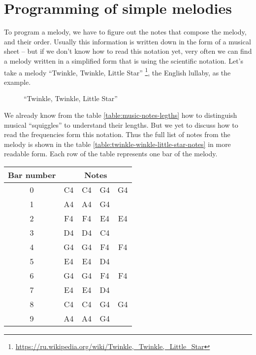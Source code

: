 \documentclass[../sparc.tex]{subfiles}
\begin{document}
\section{Programming of simple melodies}

To program a melody, we have to figure out the notes that compose the melody,
and their order.  Usually this information is written down in the form of a
musical sheet -- but if we don't know how to read this notation yet, very often
we can find a melody written in a simplified form that is using the scientific
notation.  Let's take a melody ``Twinkle, Twinkle, Little
Star'' \footnote{\url{https://ru.wikipedia.org/wiki/Twinkle,_Twinkle,_Little_Star}}, the English lullaby, as the example.

\begin{figure}[ht]
  \centering
  \caption{``Twinkle, Twinkle, Little Star''}
  \label{fig:sound-fig-3}
\end{figure}

We already know from the table \ref{table:music-notes-legths} how to distinguish
musical ``squiggles'' to understand their lengths.  But we yet to discuss how to
read the frequencies form this notation.  Thus the full list of notes from the
melody is shown in the table \ref{table:twinkle-winkle-little-star-notes} in
more readable form.  Each row of the table represents one bar of the melody.

\begin{table}[ht]
  \centering
  \begin{tabular}{|*{5}{c|}}
    \hline
    \textbf{Bar number} & \multicolumn{4}{c|}{\textbf{Notes}} \\
    \hline
    0 & C4 & C4 & G4 & G4 \\
    \hline
    1 & A4 & A4 & G4 & \\
    \hline
    2 & F4 & F4 & E4 & E4 \\
    \hline
    3 & D4 & D4 & C4 & \\
    \hline
    4 & G4 & G4 & F4 & F4 \\
    \hline
    5 & E4 & E4 & D4 & \\
    \hline
    6 & G4 & G4 & F4 & F4 \\
    \hline
    7 & E4 & E4 & D4 & \\
    \hline
    8 & C4 & C4 & G4 & G4 \\
    \hline
    9 & A4 & A4 & G4 & \\
    \hline
  \end{tabular}
  \label{table:twinkle-twinkle-little-star-notes}
\end{table}
\end{document}
